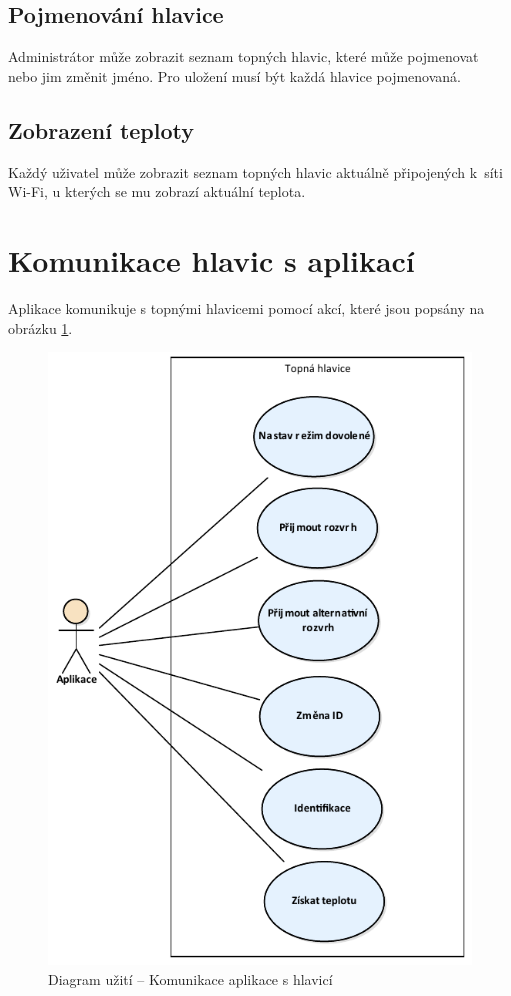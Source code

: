 \documentclass[thesis=B,czech]{FITthesis}[2012/10/20]
\begin{document}
\subsection{Pojmenování hlavice}

Administrátor může zobrazit seznam topných hlavic, které může pojmenovat nebo jim změnit jméno. Pro uložení musí být každá hlavice pojmenovaná.

\subsection{Zobrazení teploty}

Každý uživatel může zobrazit seznam topných hlavic aktuálně připojených k~síti Wi-Fi, u kterých se mu zobrazí aktuální teplota.

\section{Komunikace hlavic s aplikací}

Aplikace komunikuje s topnými hlavicemi pomocí akcí, které jsou popsány na obrázku \ref{fig:komunikace}.

\begin{figure}\centering
	\includegraphics{diagrams/UCKomunikace}
	\caption[Komunikace aplikace s hlavicí]{Diagram užití -- Komunikace aplikace s hlavicí}\label{fig:komunikace}
\end{figure}
\end{document}
